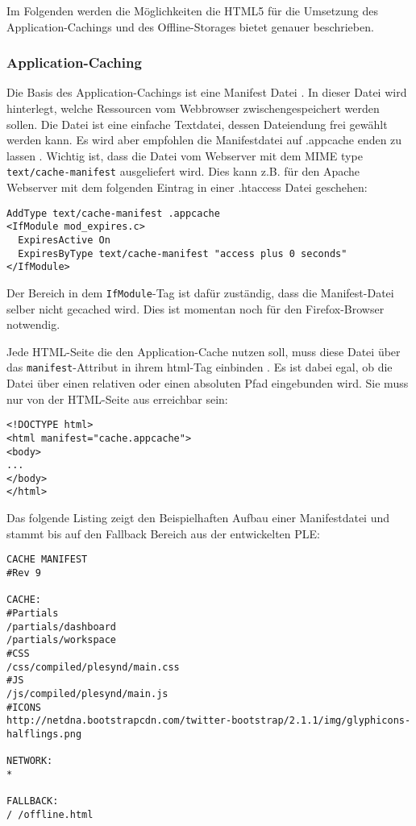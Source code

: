 Im Folgenden werden die Möglichkeiten die HTML5 für die Umsetzung des Application-Cachings und des Offline-Storages bietet genauer beschrieben.

\subsubsection{Application-Caching}\label{section:appcache}
Die Basis des Application-Cachings ist eine Manifest Datei \cite{html5_rocks_appcache_leitfaden}. In dieser Datei wird hinterlegt, welche Ressourcen vom Webbrowser zwischengespeichert werden sollen. Die Datei ist eine einfache Textdatei, dessen Dateiendung frei gewählt werden kann. Es wird aber empfohlen die Manifestdatei auf .appcache enden zu lassen \cite{w3c_offline_appcache}. Wichtig ist, dass die Datei vom Webserver mit dem MIME type \texttt{text/cache-manifest} ausgeliefert wird. Dies kann z.B. für den  Apache Webserver mit dem folgenden Eintrag in einer .htaccess Datei geschehen: 
\begin{lstlisting}
AddType text/cache-manifest .appcache
<IfModule mod_expires.c>
  ExpiresActive On
  ExpiresByType text/cache-manifest "access plus 0 seconds"
</IfModule>
\end{lstlisting}
Der Bereich in dem \texttt{IfModule}-Tag ist dafür zuständig, dass die Manifest-Datei selber nicht gecached wird. Dies ist momentan noch für den Firefox-Browser notwendig.

Jede HTML-Seite die den Application-Cache nutzen soll, muss diese Datei über das \texttt{manifest}-Attribut in ihrem html-Tag einbinden \cite{html5_up_and_running}. Es ist dabei egal, ob die Datei über einen relativen oder einen absoluten Pfad eingebunden wird. Sie muss nur von der HTML-Seite aus erreichbar sein:
\begin{lstlisting}
<!DOCTYPE html>
<html manifest="cache.appcache">
<body>
...
</body>
</html>
\end{lstlisting}

Das folgende Listing zeigt den Beispielhaften Aufbau einer Manifestdatei und stammt bis auf den Fallback Bereich aus der entwickelten PLE:
\begin{lstlisting}
CACHE MANIFEST
#Rev 9

CACHE:
#Partials
/partials/dashboard
/partials/workspace
#CSS
/css/compiled/plesynd/main.css
#JS
/js/compiled/plesynd/main.js
#ICONS
http://netdna.bootstrapcdn.com/twitter-bootstrap/2.1.1/img/glyphicons-halflings.png

NETWORK:
*

FALLBACK:
/ /offline.html
\end{lstlisting}

